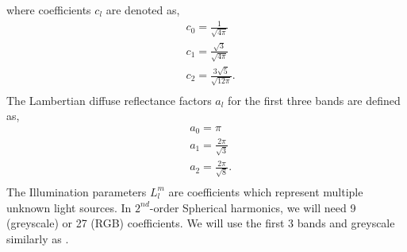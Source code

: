\documentclass[10pt,twocolumn,letterpaper]{article}
\begin{document}
where coefficients $c_l$ are denoted as,
\begin{equation}
\begin{split}
&c_0 = \frac{1}{\sqrt{4\pi}}\\
&c_1 = \frac{\sqrt{3}}{\sqrt{4\pi}}\\
&c_2 = \frac{3\sqrt{5}}{\sqrt{12\pi}}.\\
\end{split}
\end{equation}
The Lambertian diffuse reflectance factors $a_l$ for the first three bands are defined as,
\begin{equation}
\begin{split}
&a_0 = \pi\\
&a_1 = \frac{2\pi}{\sqrt{3}}\\
&a_2 = \frac{2\pi}{\sqrt{8}}.\\
\end{split}
\end{equation}
The Illumination parameters $L_l^m$ are coefficients which represent multiple unknown light sources. In $2^{nd}$-order Spherical harmonics, we will need 9 (greyscale) or 27 (RGB) coefficients. We will use the first 3 bands and greyscale similarly as \cite{sfs}.
\end{document}
